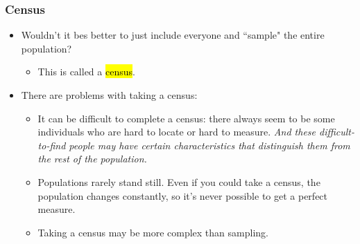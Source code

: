 \documentclass[slidestop,compress,mathserif]{beamer}
\begin{document}
\begin{frame}
	\frametitle{Census}

	\begin{itemize}

	\item Wouldn't it bes better to just include everyone and ``sample" the entire population? 

	\begin{itemize}
	\item This is called a \hl{census}.
	\end{itemize}

	\pause

	\item There are problems with taking a census:

	\begin{itemize}
	\item It can be difficult to complete a census: there always seem to be some individuals who are hard to locate or hard to measure. \textit{And these difficult-to-find people may have certain characteristics that distinguish them from the rest of the population.}
	\item Populations rarely stand still. Even if you could take a census, the population changes constantly, so it's never possible to get a perfect measure.
	\item Taking a census may be more complex than sampling.
	\end{itemize}

	\end{itemize}

\end{frame}

\end{document}

